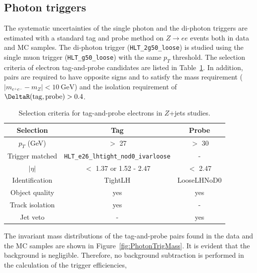 \subsection{Photon triggers}
\label{subsect:photonTrigEff}

The systematic uncertainties of the single photon and the di-photon triggers are estimated with a standard tag and probe method on $Z\rightarrow ee$ events both in data and MC samples. The di-photon trigger (\texttt{HLT\_2g50\_loose}) is studied using the single muon trigger (\texttt{HLT\_g50\_loose}) with the same $p_{T}$ threshold. The selection criteria of electron tag-and-probe candidates are listed in Table~\ref{tab:ZeeSelection}. In addition, pairs are required to have opposite signs and to satisfy the mass requirement ($|m_{e^{+}e^{-}} - m_{Z}| < 10~\si{\GeV}$) and the isolation requirement of $\DeltaR(\mathrm{tag}, \mathrm{probe}) > 0.4$. 

\begin{table}[!htb]
	\centering
	\begin{tabular}{ccc}
		\hline
		\hline
		Selection               & Tag                                           & Probe         \\
		\hline
		$p_{T}$ (GeV)           & $>$ 27                                        & $>$ 30        \\
		Trigger matched         & \texttt{HLT\_e26\_lhtight\_nod0\_ivarloose}   & -             \\
		$|\eta|$                & $<$ 1.37 or 1.52 - 2.47                       & $<$ 2.47      \\
		Identification          & TightLH                                       & LooseLHNoD0   \\
		Object quality          & yes                                           & yes           \\
		Track isolation         & yes                                           & -             \\
		Jet veto                & -                                             & yes           \\
		\hline
		\hline
	\end{tabular}
	\caption{Selection criteria for tag-and-probe electrons in $Z$+jets studies.}
	\label{tab:ZeeSelection}
\end{table}

The invariant mass distributions of the tag-and-probe pairs found in the data and the MC samples are shown in Figure~\ref{fig:PhotonTrigMass}. It is evident that the background is negligible. Therefore, no background subtraction is performed in the calculation of the trigger efficiencies, 

